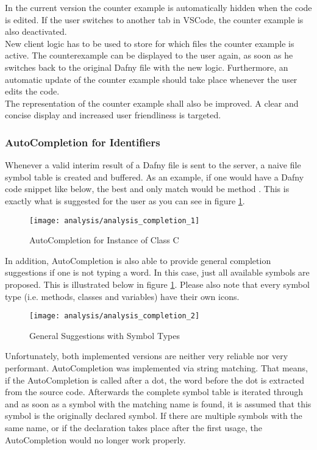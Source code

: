 In the current version the counter example is automatically hidden when the code is edited.
If the user switches to another tab in VSCode, the counter example is also deactivated. \\

New client logic has to be used to store for which files the counter example is active.
The counterexample can be displayed to the user again, as soon as he switches back to the original Dafny file with the new logic.
Furthermore, an automatic update of the counter example should take place whenever the user edits the code.\\

The representation of the counter example shall also be improved.
A clear and concise display and increased user friendliness is targeted.\\

\subsubsection{AutoCompletion for Identifiers}
Whenever a valid interim result of a Dafny file is sent to the server, a naive file symbol table is created and buffered.
As an example, if one would have a Dafny code snippet like below, the best and only match would be method .
This is exactly what is suggested for the user as you can see in figure \ref{fig:analysis_completion_1}.

\begin{figure}[H]
    \centering
    \texttt{[image: analysis/analysis\_completion\_1]}
    \caption{AutoCompletion for Instance of Class C}
    \label{fig:analysis_completion_1}
\end{figure}

In addition, AutoCompletion is also able to provide general completion suggestions if one is not typing a word.
In this case, just all available symbols are proposed.
This is illustrated below in figure \ref{fig:analysis_completion_1}.
Please also note that every symbol type (i.e. methods, classes and variables) have their own icons.

\begin{figure}[H]
    \centering
    \texttt{[image: analysis/analysis\_completion\_2]}
    \caption{General Suggestions with Symbol Types}
    \label{fig:analysis_completion_2}
\end{figure}

Unfortunately, both implemented versions are neither very reliable nor very performant.
AutoCompletion was implemented via string matching.
That means, if the AutoCompletion is called after a dot, the word before the dot is extracted from the source code.
Afterwards the complete symbol table is iterated through and as soon as a symbol with the matching name is found,
it is assumed that this symbol is the originally declared symbol.
If there are multiple symbols with the same name, or if the declaration takes place after the first usage,
the AutoCompletion would no longer work properly. \\

